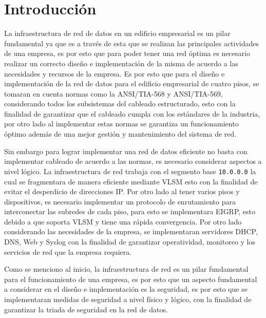 \documentclass[letterpaper,11pt]{article}
\begin{document}
    


    \newpage
    {\hypersetup{linkcolor=black}\tableofcontents}
    \thispagestyle{empty}
    
    \newpage

    \setcounter{page}{1}
    \singlespacing


    \section{Introducción}

    La infraestructura de red de datos en un edificio empresarial es un pilar fundamental ya que es a través de esta que se realizan las principales actividades de una empresa, es por esto que para  poder tener una red óptima es necesario realizar un correcto diseño e implementación de la misma de acuerdo a las necesidades y recursos de la empresa. Es por esto que para el diseño e implementación de la red de datos para el edificio empresarial de cuatro pisos, se tomaran en cuenta normas como la ANSI/TIA-568 y ANSI/TIA-569, considerando todos los subsistemas del cableado estructurado, esto con la finalidad de garantizar que el cableado cumpla con los estándares de la industria, por otro lado al implementar estas normas se garantiza un funcionamiento óptimo además de una mejor gestión y mantenimiento del sistema de red.

    Sin embargo para lograr implementar una red de datos eficiente no basta con implementar cableado de acuerdo a las normas, es necesario considerar aspectos a nivel lógico. La infraestructura de red trabaja con el segmento base \texttt{10.0.0.0} la cual se fragmentara de manera eficiente mediante VLSM esto con la finalidad de evitar el desperdicio de direcciones IP. Por otro lado al tener varios pisos y dispositivos, es necesario implementar un protocolo de enrutamiento para interconectar las subredes de cada piso, para esto se implementara EIGRP, esto debido a que soporta VLSM y tiene una rápida convergencia. Por otro lado considerando las necesidades de la empresa, se implementaran servidores DHCP, DNS, Web y Syslog con la finalidad de garantizar operatividad, monitoreo y los servicios de red que la empresa requiera.

    Como se menciono al inicio, la infraestructura de red es un pilar fundamental para el funcionamiento de una empresa, es por esto que un aspecto fundamental a considerar en el diseño e implementación es la seguridad, es por esto que se implementaran medidas de seguridad a nivel físico y lógico, con la finalidad de garantizar la triada de seguridad en la red de datos.
\end{document}

